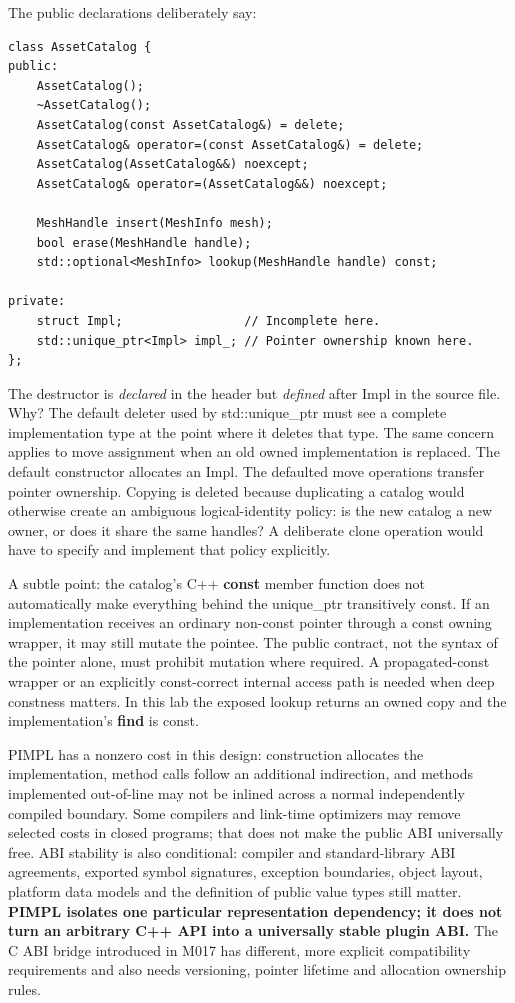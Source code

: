 The public declarations deliberately say:

\begin{verbatim}
class AssetCatalog {
public:
    AssetCatalog();
    ~AssetCatalog();
    AssetCatalog(const AssetCatalog&) = delete;
    AssetCatalog& operator=(const AssetCatalog&) = delete;
    AssetCatalog(AssetCatalog&&) noexcept;
    AssetCatalog& operator=(AssetCatalog&&) noexcept;

    MeshHandle insert(MeshInfo mesh);
    bool erase(MeshHandle handle);
    std::optional<MeshInfo> lookup(MeshHandle handle) const;

private:
    struct Impl;                 // Incomplete here.
    std::unique_ptr<Impl> impl_; // Pointer ownership known here.
};
\end{verbatim}

The destructor is \emph{declared} in the header but \emph{defined} after Impl in the source file. Why? The default deleter used by std::unique\_ptr must see a complete implementation type at the point where it deletes that type. The same concern applies to move assignment when an old owned implementation is replaced. The default constructor allocates an Impl. The defaulted move operations transfer pointer ownership. Copying is deleted because duplicating a catalog would otherwise create an ambiguous logical-identity policy: is the new catalog a new owner, or does it share the same handles? A deliberate clone operation would have to specify and implement that policy explicitly.

A subtle point: the catalog's C++ \textbf{const} member function does not automatically make everything behind the unique\_ptr transitively const. If an implementation receives an ordinary non-const pointer through a const owning wrapper, it may still mutate the pointee. The public contract, not the syntax of the pointer alone, must prohibit mutation where required. A propagated-const wrapper or an explicitly const-correct internal access path is needed when deep constness matters. In this lab the exposed lookup returns an owned copy and the implementation's \textbf{find} is const.

PIMPL has a nonzero cost in this design: construction allocates the implementation, method calls follow an additional indirection, and methods implemented out-of-line may not be inlined across a normal independently compiled boundary. Some compilers and link-time optimizers may remove selected costs in closed programs; that does not make the public ABI universally free. ABI stability is also conditional: compiler and standard-library ABI agreements, exported symbol signatures, exception boundaries, object layout, platform data models and the definition of public value types still matter. \textbf{PIMPL isolates one particular representation dependency; it does not turn an arbitrary C++ API into a universally stable plugin ABI.} The C ABI bridge introduced in M017 has different, more explicit compatibility requirements and also needs versioning, pointer lifetime and allocation ownership rules.

